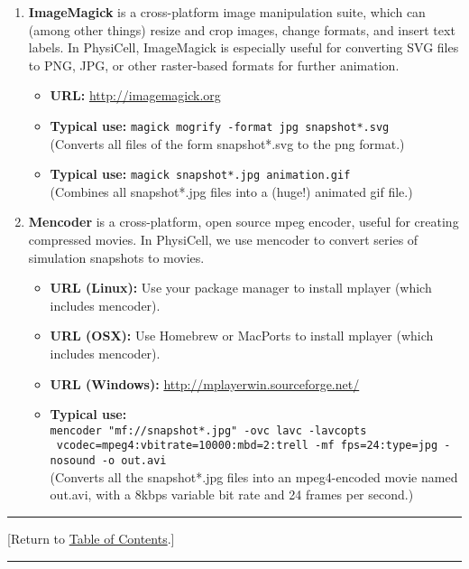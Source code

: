 \documentclass[12pt]{article}
\renewcommand{\v}{\verb}
\newcommand{\TOClink}{\begin{center}\hrule\vskip-10pt\phantom{.}\hfill[Return to \hyperlink{TOC}{Table of Contents}.]\hfill\phantom{.}\vskip3pt\hrule\end{center}}
\begin{document}
\begin{enumerate}
\item 
\textbf{ImageMagick} is a cross-platform image manipulation suite, which can (among other things)
resize and crop images, change formats, and insert text labels. In PhysiCell, ImageMagick is especially 
useful for converting SVG files to PNG, JPG, or other raster-based formats for further animation. 

\begin{itemize}
\item\textbf{URL:} 
\href{http://imagemagick.org}{http://imagemagick.org} 
\item\textbf{Typical use:} \v|magick mogrify -format jpg snapshot*.svg| \\
\hspace{1in}(Converts all files of the form snapshot*.svg to the png format.)
\item\textbf{Typical use:} \v|magick snapshot*.jpg animation.gif| \\
\hspace{1in}(Combines all snapshot*.jpg files into a (huge!) animated gif file.)
\end{itemize}

\item 
\textbf{Mencoder} is a cross-platform, open source mpeg encoder, useful for creating compressed 
movies. In PhysiCell, we use mencoder to convert series of simulation snapshots to movies. 
\begin{itemize}
\item \textbf{URL (Linux):} Use your package manager to install mplayer (which includes mencoder). 
\item \textbf{URL (OSX):} Use Homebrew or MacPorts to install mplayer (which includes mencoder).
\item \textbf{URL (Windows):} \href{http://mplayerwin.sourceforge.net/}{http://mplayerwin.sourceforge.net/}
\item \textbf{Typical use:} \\
\normalsize\v|mencoder "mf://snapshot*.jpg" -ovc lavc -lavcopts| \\
\normalsize\v| vcodec=mpeg4:vbitrate=10000:mbd=2:trell -mf fps=24:type=jpg -nosound -o out.avi|\normalsize \\
\hspace{1in}(Converts all the snapshot*.jpg files into an mpeg4-encoded movie named out.avi, with a 8kbps variable bit rate and 24 frames per second.) 
\end{itemize}

\end{enumerate}
\TOClink
\end{document}
